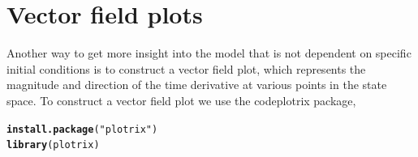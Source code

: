 \documentclass[11pt]{article}\usepackage[]{graphicx}\usepackage[]{color}
\makeatletter
\newcommand{\hlstr}[1]{\textcolor[rgb]{0.192,0.494,0.8}{#1}}%
\newcommand{\hlstd}[1]{\textcolor[rgb]{0.345,0.345,0.345}{#1}}%
\newcommand{\hlkwd}[1]{\textcolor[rgb]{0.737,0.353,0.396}{\textbf{#1}}}%
\newenvironment{kframe}{%
 \def\at@end@of@kframe{}%
 \ifinner\ifhmode%
  \def\at@end@of@kframe{\end{minipage}}%
  \begin{minipage}{\columnwidth}%
 \fi\fi%
 \def\FrameCommand##1{\hskip\@totalleftmargin \hskip-\fboxsep
 \colorbox{shadecolor}{##1}\hskip-\fboxsep
     \hskip-\linewidth \hskip-\@totalleftmargin \hskip\columnwidth}%
 \MakeFramed {\advance\hsize-\width
   \@totalleftmargin\z@ \linewidth\hsize
   \@setminipage}}%
 {\par\unskip\endMakeFramed%
 \at@end@of@kframe}
\newenvironment{knitrout}{}{} %
\numberwithin{exercise}{section}
\makeatother
\begin{document}
\section{Vector field plots}

Another way to get more insight into the model that is not dependent
on specific initial conditions is to construct a vector field plot,
which represents the magnitude and direction of the time derivative at
various points in the state space.  To construct a vector field plot
we use the code{plotrix} package,
\begin{knitrout}
\color{fgcolor}\begin{kframe}
\begin{alltt}
\hlkwd{install.package}\hlstd{(}\hlstr{"plotrix"}\hlstd{)}
\hlkwd{library}\hlstd{(plotrix)}
\end{alltt}
\end{kframe}
\end{knitrout}
\end{document}
